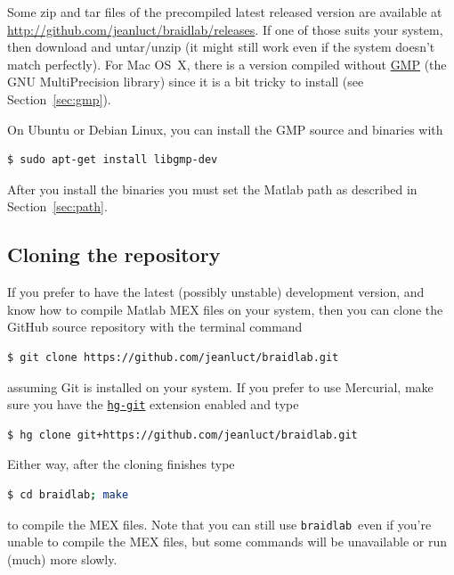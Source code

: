 \documentclass[12pt]{article}
\newcommand{\braidlab}{\texttt{braidlab}}%
\begin{document}
Some zip and tar files of the precompiled latest released version are
available at \url{http://github.com/jeanluct/braidlab/releases}.  If one of
those suits your system, then download and untar/unzip (it might still work
even if the system doesn't match perfectly).  For Mac OS~X, there is a version
compiled without \href{https://gmplib.org/}{GMP} (the GNU MultiPrecision
library) %
%
since it is a bit tricky to install (see Section~\ref{sec:gmp}).

On Ubuntu or Debian Linux, you can install the GMP source and binaries with
\begin{lstlisting}[frame=single,framerule=0pt,escapechar=*,%
  language=bash,backgroundcolor=\color{white}]
$ sudo apt-get install libgmp-dev
\end{lstlisting}
After you install the binaries you must set the Matlab path as described in
Section~\ref{sec:path}.

\subsection{Cloning the repository}
\label{sec:cloning}

 If you prefer to have the latest (possibly unstable) development
version, and know how to compile Matlab MEX %
 files on your system, then you can clone the GitHub
source repository with the terminal command
\begin{lstlisting}[frame=single,framerule=0pt,escapechar=*,%
  language=bash,backgroundcolor=\color{white}]
$ git clone https://github.com/jeanluct/braidlab.git
\end{lstlisting}
assuming Git is installed on your system.  If you prefer to use
Mercurial, make sure you have the
\href{http://hg-git.github.io/}{\lstinline{hg-git}} extension enabled and type
\begin{lstlisting}[frame=single,framerule=0pt,escapechar=*,%
  language=bash,backgroundcolor=\color{white}]
$ hg clone git+https://github.com/jeanluct/braidlab.git
\end{lstlisting}
Either way, after the cloning finishes type
\begin{lstlisting}[frame=single,framerule=0pt,escapechar=*,%
  language=bash,backgroundcolor=\color{white}]
$ cd braidlab; make
\end{lstlisting}
to compile the MEX files.  Note that you can still use \braidlab\ even if
you're unable to compile the MEX files, but some commands will be unavailable
or run (much) more slowly.
\end{document}
